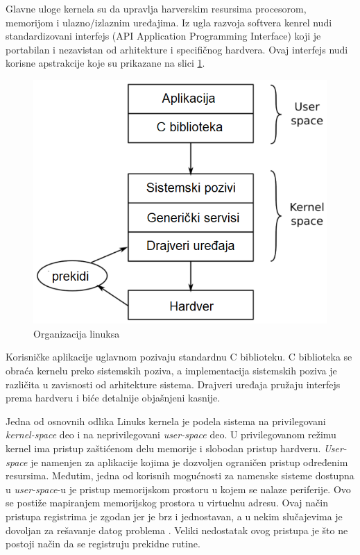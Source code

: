 Glavne uloge kernela su da upravlja harverskim resursima procesorom, memorijom i ulazno/izlaznim uređajima. Iz ugla razvoja softvera kenrel nudi standardizovani interfejs (API Application Programming Interface) koji je portabilan i nezavistan od arhitekture i specifičnog hardvera. Ovaj interfejs nudi korisne apstrakcije koje su prikazane na slici \ref{slika1:linux1}.\\
\begin{figure}[h!]
\centering
\includegraphics[scale=0.5]{img/linux1.png}
\caption{Organizacija linuksa}
\label{slika1:linux1}
\end{figure}
Korisničke aplikacije uglavnom pozivaju standardnu C biblioteku. C biblioteka se obraća kernelu preko sistemskih poziva, a implementacija sistemskih poziva je različita u zavisnosti od arhitekture sistema. Drajveri uređaja pružaju interfejs prema hardveru i biće detalnije objašnjeni kasnije.

Jedna od osnovnih odlika Linuks kernela je podela sistema na privilegovani \textit{kernel-space} deo i na neprivilegovani \textit{user-space} deo. U privilegovanom režimu kernel ima pristup zaštićenom delu memorije i slobodan pristup hardveru. \textit{User-space} je namenjen za aplikacije kojima je dozvoljen ograničen pristup određenim resursima. Međutim, jedna od korisnih mogućnosti za namenske sisteme dostupna u \textit{user-space}-u je pristup memorijskom prostoru u kojem se nalaze periferije. Ovo se postiže mapiranjem memorijskog prostora u virtuelnu adresu. Ovaj način pristupa registrima je zgodan jer je brz i jednostavan, a u nekim slučajevima je dovoljan za rešavanje datog problema \cite{mmap}. Veliki nedostatak ovog pristupa je što ne postoji način da se registruju prekidne rutine.

